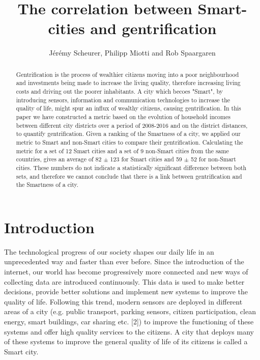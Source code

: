\documentclass[a4paper, 10pt]{IEEEconf}      %
\title{\LARGE \bf The correlation between Smart-cities and gentrification }
\author{Jérémy Scheurer, Philipp Miotti and Rob Spaargaren}
\begin{document}
\maketitle
\thispagestyle{empty}
\pagestyle{empty}


\begin{abstract}
Gentrification is the process of wealthier citizens moving into a poor neighbourhood and investments being made to increase the living quality, therefore increasing living costs and driving out the poorer inhabitants. A city which becoes "Smart", by introducing sensors, information and communication technologies to increase the quality of life, might spur an influx of wealthy citizens, causing gentrification. In this paper we have constructed a metric based on the evolution of household incomes between different city districts over a period of 2008-2016 and on the district distances, to quantify gentrification. Given a ranking of the Smartness of a city, we applied our metric to Smart and non-Smart cities to compare their gentrification. Calculating the metric for a set of 12 Smart cities and a set of 9 non-Smart cities from the same countries, gives an average of 82 $\pm$ 123 for Smart cities and 59 $\pm$ 52 for non-Smart cities. These numbers do not indicate a statistically significant difference between both sets, and therefore we cannot conclude that there is a link between gentrification and the Smartness of a city.


\end{abstract}


\section{Introduction}
\label{sec:Introduction}
The technological progress of our society shapes our daily life in an unprecedented
way and faster than ever before. Since the introduction of the internet, our world 
has become progressively more connected and new ways of collecting data are introduced
continuously. This data is used to make better decisions, provide better solutions and  implement new systems to improve the quality of life.
Following this trend, modern sensors are deployed in different areas of a city
(e.g. public transport, parking sensors, citizen participation, clean energy, smart buildings, car sharing etc. [2]) to improve the functioning of these systems 
and offer high quality services to the citizens. A city that deploys many of these systems
to improve the general quality of life of its citizens is called a Smart city.
\end{document}
